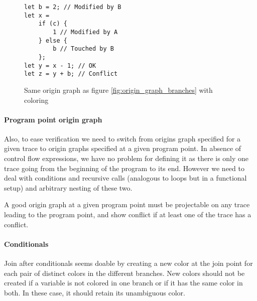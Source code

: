 \documentclass[a4paper,10pt]{article}
\begin{document}
\begin{figure}[ht]
\begin{minipage}{.5\textwidth}
\begin{lstlisting}
let b = 2; // Modified by B
let x =
    if (c) {
        1 // Modified by A
    } else {
        b // Touched by B
    };
let y = x - 1; // OK
let z = y + b; // Conflict
\end{lstlisting}
\end{minipage}\hfill
\begin{minipage}{.45\textwidth}
\centering{}
\end{minipage}
\caption{Same origin graph as figure \ref{fig:origin_graph_branches} with coloring}
\label{fig:origin_graph_branches_color}
\end{figure}

\paragraph{Program point origin graph} Also, to ease verification we need to switch from origins graph specified for a given trace to origin graphs specified at a given program point. In absence of control flow expressions, we have no problem for defining it as there is only one trace going from the beginning of the program to its end. However we need to deal with conditions and recursive calls (analogous to loops but in a functional setup) and arbitrary nesting of these two.

A good origin graph at a given program point must be projectable on any trace leading to the program point, and show conflict if at least one of the trace has a conflict.

\paragraph{Conditionals} Join after conditionals seems doable by creating a new color at the join point for each pair of distinct colors in the different branches. New colors should not be created if a variable is not colored in one branch or if it has the same color in both. In these case, it should retain its unambiguous color.
\end{document}
